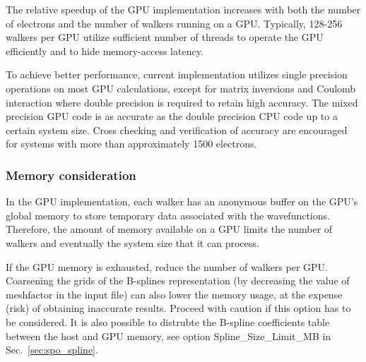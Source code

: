 The relative speedup of the GPU implementation increases with both the number of electrons and the number of walkers running on a GPU. Typically, 128-256 walkers per GPU utilize sufficient number of threads to operate the GPU efficiently and to hide memory-access latency.

To achieve better performance, current implementation utilizes single precision operations on most GPU calculations, except for matrix inversions and Coulomb interaction where double precision is required to retain high accuracy. The mixed precision GPU code is as accurate as the double precision CPU code up to a certain system size. Cross checking and verification of accuracy are encouraged for systems with more than approximately 1500 electrons.


\subsubsection{Memory consideration}

In the GPU implementation, each walker has an anonymous buffer on the GPU's global memory to store temporary data associated with the wavefunctions. Therefore, the amount of memory available on a GPU limits the number of walkers and eventually the system size that it can process.

If the GPU memory is exhausted, reduce the number of walkers per GPU.
Coarsening the grids of the B-splines representation (by decreasing the value of meshfactor in the input file) can also lower the memory usage,
at the expense (risk) of obtaining inaccurate results. Proceed with caution if this option has to be considered.
It is also possible to distrubte the B-spline coefficients table between the host and GPU memory, see option Spline\_Size\_Limit\_MB in Sec.~\ref{sec:spo_spline}.
